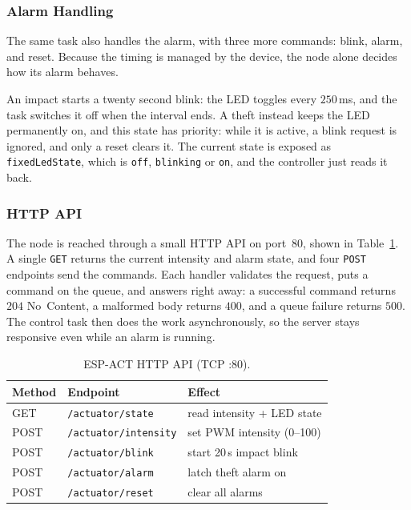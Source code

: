 \documentclass[conference]{IEEEtran}
\begin{document}
\subsubsection{Alarm Handling}
The same task also handles the alarm, with three more commands: blink, alarm, and reset. Because the timing is managed by the device, the node alone decides how its alarm behaves.

An impact starts a twenty second blink: the LED toggles every $250$\,ms, and the task switches it off when the interval ends. A theft instead keeps the LED permanently on, and this state has priority: while it is active, a blink request is ignored, and only a reset clears it. The current state is exposed as \texttt{fixedLedState}, which is \texttt{off}, \texttt{blinking} or \texttt{on}, and the controller just reads it back.

\subsubsection{HTTP API}
The node is reached through a small HTTP API on port~$80$, shown in Table~\ref{tab:http}. A single \texttt{GET} returns the current intensity and alarm state, and four \texttt{POST} endpoints send the commands. Each handler validates the request, puts a command on the queue, and answers right away: a successful command returns $204$ No~Content, a malformed body returns $400$, and a queue failure returns $500$. The control task then does the work asynchronously, so the server stays responsive even while an alarm is running.

\begin{table}[htbp]
\caption{ESP-ACT HTTP API (TCP :80).}
\label{tab:http}
\centering
\footnotesize
\begin{tabular}{@{}lll@{}}
\toprule
\textbf{Method} & \textbf{Endpoint} & \textbf{Effect} \\
\midrule
GET  & \texttt{/actuator/state} & read intensity + LED state \\
POST & \texttt{/actuator/intensity} & set PWM intensity (0--100) \\
POST & \texttt{/actuator/blink} & start 20\,s impact blink \\
POST & \texttt{/actuator/alarm} & latch theft alarm on \\
POST & \texttt{/actuator/reset} & clear all alarms \\
\bottomrule
\end{tabular}
\end{table}
\end{document}
